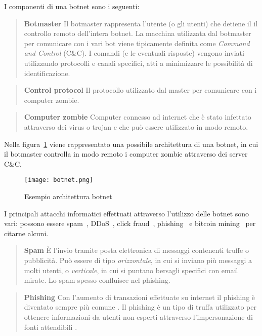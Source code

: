 \documentclass[../main.tex]{subfiles}
\begin{document}
I componenti di una botnet sono i seguenti:

\begin{verse}
				\textbf{Botmaster} Il botmaster rappresenta l'utente (o gli utenti) che detiene il il controllo remoto dell'intera botnet. La macchina utilizzata dal botmaster per comunicare con i vari bot viene tipicamente definita come \textit{Command and Control} (C\&C). I comandi (e le eventuali risposte) vengono inviati utilizzando protocolli e canali specifici, atti a minimizzare le possibilità di identificazione.
\end{verse}

\begin{verse}
				\textbf{Control protocol} Il protocollo utilizzato dal master per comunicare con i computer zombie.
\end{verse}

\begin{verse}
				\textbf{Computer zombie} Computer connesso ad internet che è stato infettato attraverso dei virus o trojan e che può essere utilizzato in modo remoto. 
\end{verse}

Nella figura~\ref{fig:architetturaBotnet} viene rappresentato una possibile architettura di una botnet, in cui il botmaster controlla in modo remoto i computer zombie attraverso dei server C\&C.
\begin{figure}[H]
				\centering
				\texttt{[image: botnet.png]}
				\caption{Esempio architettura botnet}
				\label{fig:architetturaBotnet}
\end{figure}

I principali attacchi informatici effettuati attraverso l'utilizzo delle botnet sono vari: possono essere spam~\cite{botnetspam}, DDoS~\cite{ddosbotnet}, click fraud~\cite{clickfraudbotnet}, phishing~\cite{phishingbotnet} e bitcoin mining~\cite{bitcoinbotnet} per citarne alcuni. 

\begin{verse}
				\textbf{Spam} È l'invio tramite posta elettronica di messaggi contenenti truffe o pubblicità. Può essere di tipo \textit{orizzontale}, in cui si inviano più messaggi a molti utenti, o \textit{verticale}, in cui si puntano bersagli specifici con email mirate. Lo spam spesso confluisce nel phishing.
\end{verse}

\begin{verse}
				\textbf{Phishing} Con l'aumento di transazioni effettuate su internet il phishing è diventato sempre più comune \cite{phishing}. Il phishing è un tipo di truffa utilizzato per ottenere informazioni da utenti non esperti attraverso l'impersonazione di fonti attendibili \cite{phishingdef}.
\end{verse}
\end{document}
